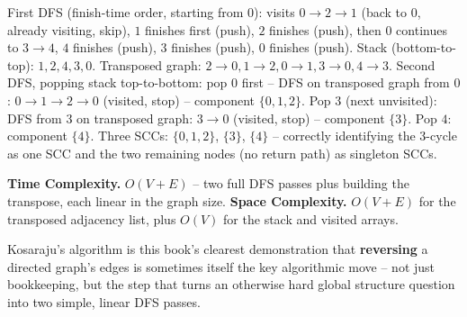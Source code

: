 
First DFS (finish-time order, starting from $0$): visits $0\to2\to1$
(back to $0$, already visiting, skip), $1$ finishes first (push),
$2$ finishes (push), then $0$ continues to $3\to4$, $4$ finishes
(push), $3$ finishes (push), $0$ finishes (push). Stack
(bottom-to-top): $1,2,4,3,0$. Transposed graph: $2{\to}0,1{\to}2,0{\to}1,
3{\to}0,4{\to}3$. Second DFS, popping stack top-to-bottom: pop $0$
first -- DFS on transposed graph from $0$: $0\to1\to2\to0$ (visited,
stop) -- component $\{0,1,2\}$. Pop $3$ (next unvisited): DFS from $3$
on transposed graph: $3\to0$ (visited, stop) -- component $\{3\}$.
Pop $4$: component $\{4\}$. Three SCCs: $\{0,1,2\}$, $\{3\}$, $\{4\}$
-- correctly identifying the $3$-cycle as one SCC and the two
remaining nodes (no return path) as singleton SCCs.

\begin{complexitybox}
\textbf{Time Complexity.} $O(V+E)$ -- two full DFS passes plus
building the transpose, each linear in the graph size.
\textbf{Space Complexity.} $O(V+E)$ for the transposed adjacency list,
plus $O(V)$ for the stack and visited arrays.
\end{complexitybox}

\begin{takeawaybox}
Kosaraju's algorithm is this book's clearest demonstration that
\textbf{reversing} a directed graph's edges is sometimes itself the
key algorithmic move -- not just bookkeeping, but the step that turns
an otherwise hard global structure question into two simple, linear
DFS passes.
\end{takeawaybox}
